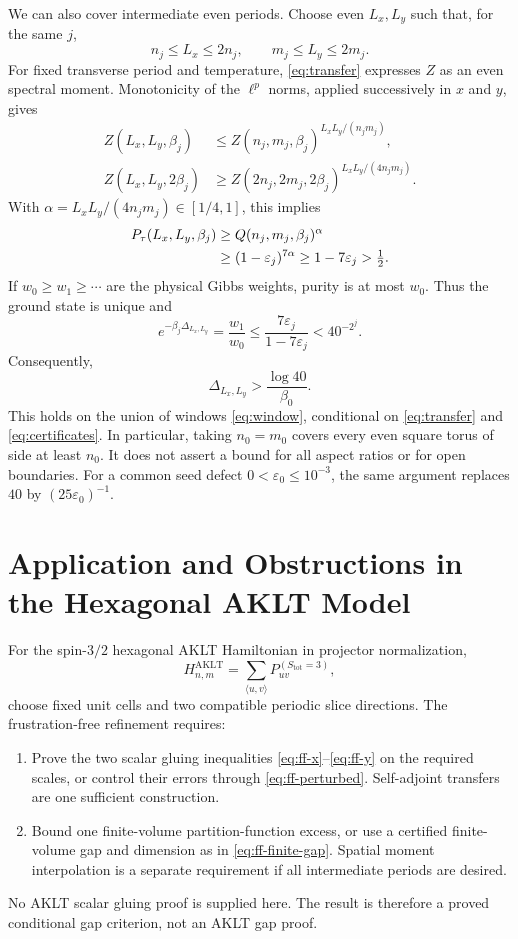 \documentclass[11pt]{article}
\newcommand{\ee}{\varepsilon}
\begin{document}
We can also cover intermediate even periods. Choose even \(L_x,L_y\)
such that, for the same \(j\),
\begin{equation}
	n_j\le L_x\le2n_j,\qquad m_j\le L_y\le2m_j.
	\label{eq:window}
\end{equation}
For fixed transverse period and temperature, \eqref{eq:transfer}
expresses \(Z\) as an even spectral moment. Monotonicity of the
\(\ell^p\) norms, applied successively in \(x\) and \(y\), gives
\begin{align*}
	Z(L_x,L_y,\beta_j)
	 & \le Z(n_j,m_j,\beta_j)^{L_xL_y/(n_jm_j)},     \\
	Z(L_x,L_y,2\beta_j)
	 & \ge Z(2n_j,2m_j,2\beta_j)^{L_xL_y/(4n_jm_j)}.
\end{align*}
With \(\alpha=L_xL_y/(4n_jm_j)\in[1/4,1]\), this implies
\begin{align}
	P_\tau(L_x,L_y,\beta_j)
	 & \ge Q(n_j,m_j,\beta_j)^\alpha\notag         \\
	 & \ge(1-\ee_j)^{7\alpha}\ge1-7\ee_j>\tfrac12.
	\label{eq:interpolation}
\end{align}
If \(w_0\ge w_1\ge\cdots\) are the physical Gibbs weights, purity
is at most \(w_0\). Thus the ground state is unique and
\[
	e^{-\beta_j\Delta_{L_x,L_y}}
	=\frac{w_1}{w_0}
	\le\frac{7\ee_j}{1-7\ee_j}
	<40^{-2^j}.
\]
Consequently,
\begin{equation}
	\boxed{\Delta_{L_x,L_y}>\frac{\log40}{\beta_0}.}
	\label{eq:gap}
\end{equation}
This holds on the union of windows \eqref{eq:window}, conditional on
\eqref{eq:transfer} and \eqref{eq:certificates}. In particular, taking
\(n_0=m_0\) covers every even square torus of side at least \(n_0\).
It does not assert a bound for all aspect ratios or for open boundaries.
For a common seed defect \(0<\ee_0\le10^{-3}\), the same argument
replaces \(40\) by \((25\ee_0)^{-1}\).

\section{Application and Obstructions in the Hexagonal AKLT Model}

For the spin-\(3/2\) hexagonal AKLT Hamiltonian in projector
normalization,
\[
	H_{n,m}^{\mathrm{AKLT}}=\sum_{\langle u,v\rangle}
	P_{uv}^{(S_{\mathrm{tot}}=3)},
\]
choose fixed unit cells and two compatible periodic slice directions.
The frustration-free refinement requires:
\begin{enumerate}
	\item Prove the two scalar gluing inequalities
	      \eqref{eq:ff-x}--\eqref{eq:ff-y} on the required scales, or
	      control their errors through \eqref{eq:ff-perturbed}.
	      Self-adjoint transfers are one sufficient construction.
	\item Bound one finite-volume partition-function excess, or use a
	      certified finite-volume gap and dimension as in
	      \eqref{eq:ff-finite-gap}. Spatial moment interpolation is a
	      separate requirement if all intermediate periods are desired.
\end{enumerate}
No AKLT scalar gluing proof is supplied here. The result is therefore
a proved conditional gap criterion, not an AKLT gap proof.
\end{document}
